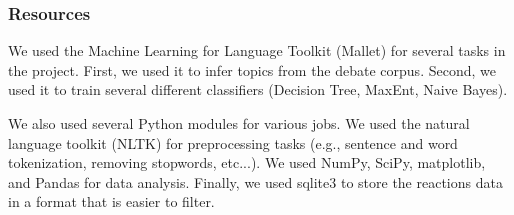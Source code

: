 \subsubsection{Resources}

We used the Machine Learning for Language Toolkit (Mallet) for several tasks in the project.
First, we used it to infer topics from the debate corpus.
Second, we used it to train several different classifiers (Decision Tree, MaxEnt, Naive Bayes).

We also used several Python modules for various jobs.
We used the natural language toolkit (NLTK) for preprocessing tasks (e.g., sentence and word tokenization, removing stopwords, etc...).
We used NumPy, SciPy, matplotlib, and Pandas for data analysis.
Finally, we used sqlite3 to store the reactions data in a format that is easier to filter.
